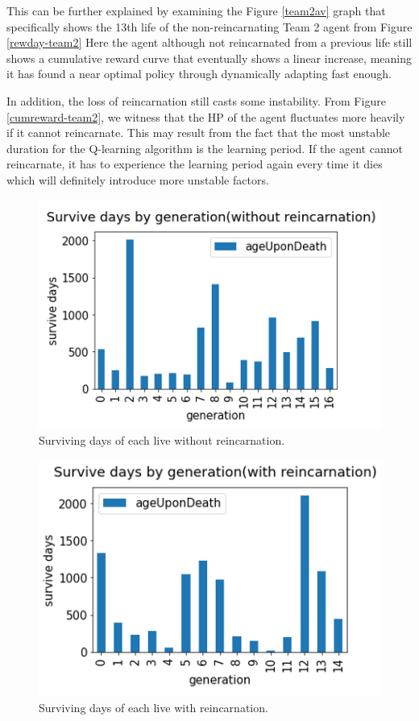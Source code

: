 This can be further explained by examining the Figure \ref{team2av} graph that specifically shows the 13th life of the non-reincarnating Team 2 agent from Figure \ref{rewday-team2} Here the agent although not reincarnated from a previous life still shows a cumulative reward curve that eventually shows a linear increase, meaning it has found a near optimal policy through dynamically adapting fast enough.

In addition, the loss of reincarnation still casts some instability. From Figure \ref{cumreward-team2}, we witness that the HP of the agent fluctuates more heavily if it cannot reincarnate. This may result from the fact that the most unstable duration for the Q-learning algorithm is the learning period. If the agent cannot reincarnate, it has to experience the learning period again every time it dies which will definitely introduce more unstable factors. 

\begin{figure}
\centering
\includegraphics{004_team_2_agent_design/suvdayworein}
\caption{Surviving days of each live without reincarnation.}
\end{figure}

\begin{figure}
\centering
\includegraphics{004_team_2_agent_design/suvdaywrein}
\caption{Surviving days of each live with reincarnation.}
\end{figure}

